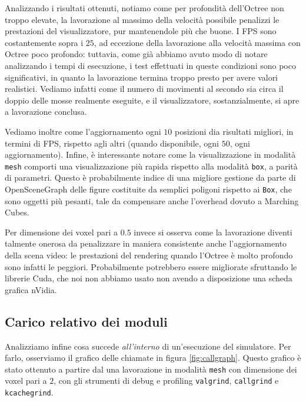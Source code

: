 Analizzando i risultati ottenuti, notiamo come per profondità dell'Octree non troppo elevate, la lavorazione al massimo della velocità possibile penalizzi le prestazioni del visualizzatore, pur mantenendole più che buone. I FPS sono costantemente sopra i $25$, ad eccezione della lavorazione alla velocità massima con Octree poco profondo: tuttavia, come già abbiamo avuto modo di notare analizzando i tempi di esecuzione, i test effettuati in queste condizioni sono poco significativi, in quanto la lavorazione termina troppo presto per avere valori realistici. Vediamo infatti come il numero di movimenti al secondo sia circa il doppio delle mosse realmente eseguite, e il visualizzatore, sostanzialmente, si apre a lavorazione conclusa.

Vediamo inoltre come l'aggiornamento ogni $10$ posizioni dia risultati migliori, in termini di FPS, rispetto agli altri (quando disponibile, ogni $50$, ogni aggiornamento). Infine, è interessante notare come la visualizzazione in modalità \texttt{mesh} comporti una visualizzazione più rapida rispetto alla modalità \texttt{box}, a parità di parametri. Questo è probabilmente indice di una migliore gestione da parte di OpenSceneGraph delle figure costituite da semplici poligoni rispetto ai \texttt{Box}, che sono oggetti più pesanti, tale da compensare anche l'overhead dovuto a Marching Cubes.

Per dimensione dei voxel pari a $0.5$ invece si osserva come la lavorazione diventi talmente onerosa da penalizzare in maniera consistente anche l'aggiornamento della scena video: le prestazioni del rendering quando l'Octree è molto profondo sono infatti le peggiori. Probabilmente potrebbero essere migliorate sfruttando le librerie Cuda, che noi non abbiamo usato non avendo a disposizione una scheda grafica nVidia.

\subsection{Carico relativo dei moduli}
Analizziamo infine cosa succede \textit{all'interno} di un'esecuzione del simulatore. Per farlo, osserviamo il grafico delle chiamate in figura \ref{fig:callgraph}. Questo grafico è stato ottenuto a partire dal una lavorazione in modalità \texttt{mesh} con dimensione dei voxel pari a $2$, con gli strumenti di debug e profiling \texttt{valgrind}, \texttt{callgrind} e \texttt{kcachegrind}.

